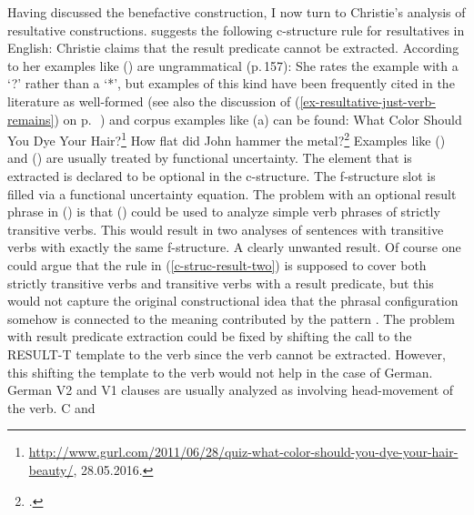 Having discussed the benefactive construction, I now turn to Christie's analysis of resultative constructions. \citet{Christie2010a}
suggests the following c-structure rule for resultatives in English:
\ea
\label{c-struc-result-two}
\z
Christie claims that the result predicate cannot be extracted. According to her examples like
() are ungrammatical (p.\,157):
\z
She rates the example with a `?' rather than a `*', but examples of this kind have been frequently
cited in the literature as well-formed (see also the discussion of
(\ref{ex-resultative-just-verb-remains}) on p.\,~\pageref{ex-resultative-just-verb-remains}) and
corpus examples like (a) can be found:
\eal
\ex  What Color Should You Dye Your Hair?\footnote{%
  \url{http://www.gurl.com/2011/06/28/quiz-what-color-should-you-dye-your-hair-beauty/}, 28.05.2016.
}
\ex How flat did John hammer the metal?\footnote{%
  .
}
\zl
Examples like () and () are usually treated by
functional uncertainty. The element that is extracted is declared to be optional in the
c-structure. The f-structure slot is filled via a functional uncertainty equation. The problem with
an optional result phrase in () is that () could be used to analyze simple
verb phrases of strictly transitive verbs. This would result in two analyses of sentences with
transitive verbs with exactly the same f-structure. A clearly unwanted result. Of course one could
argue that the rule in (\ref{c-struc-result-two}) is supposed to cover both strictly transitive
verbs and transitive verbs with a result predicate, but this would not capture the original
constructional idea that the phrasal configuration somehow is connected to the meaning contributed
by the pattern \citep{Goldberg95a,GJ2004a}.
The problem with result predicate extraction could be fixed by shifting the call to the RESULT-T
template to the verb since the verb cannot be extracted. However, this shifting the template to the verb would not help in the case of
German. German V2 and V1 clauses are usually analyzed as involving head-movement of the verb. C and
